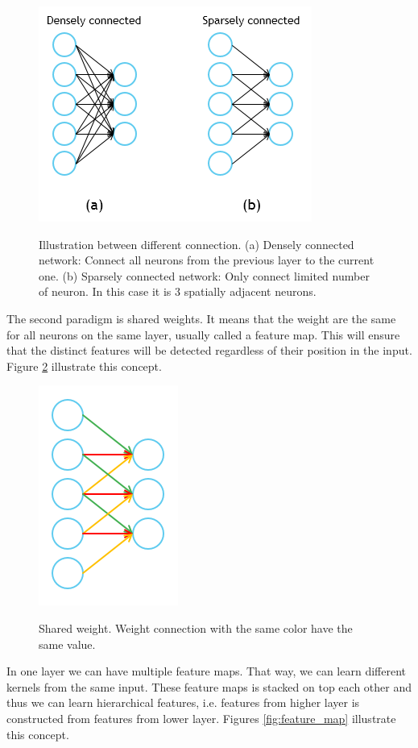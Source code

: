 \documentclass[a4paper,11pt]{kth-mag}
\begin{document}
\begin{figure}[h]
\centering
\includegraphics[scale=0.5]{image/sparse.png}
\label{fig:sparse}
\caption{Illustration between different connection. (a) Densely connected network: Connect all neurons from the previous layer to the current one. (b) Sparsely connected network: Only connect limited number of neuron. In this case it is 3 spatially adjacent neurons.}
\end{figure}

The second paradigm is shared weights. It means that the weight are the same for all neurons on the same layer, usually called a feature map. This will ensure that the distinct features will be detected regardless of their position in the input. Figure \ref{fig:shared} illustrate this concept. 

\begin{figure}[h]
\centering
\includegraphics[scale=0.5]{image/shared.png}
\label{fig:shared}
\caption{Shared weight. Weight connection with the same color have the same value.}
\end{figure}

In one layer we can have multiple feature maps. That way, we can learn different kernels from the same input. These feature maps is stacked on top each other and thus we can learn hierarchical features, i.e. features from higher layer is constructed from features from lower layer. Figures \ref{fig:feature_map} illustrate this concept.
\end{document}
